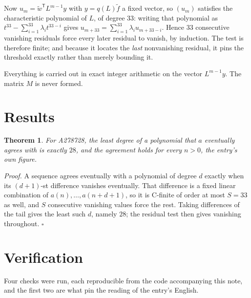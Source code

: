 \documentclass[11pt]{article}
\newtheorem{theorem}{Theorem}
\theoremstyle{definition}
\begin{document}
Now $u_m = \tilde w^{\mathsf T} L^{m-1} y$ with $y = q(L)\tilde f$ a fixed vector, so $(u_m)$ satisfies the characteristic polynomial of $L$, of degree $33$: writing that polynomial as $t^{33} - \sum_{i=1}^{33} \lambda_i t^{33-i}$ gives $u_{m+33} = \sum_{i=1}^{33} \lambda_i u_{m+33-i}$. Hence $33$ consecutive vanishing residuals force every later residual to vanish, by induction. The test is therefore finite; and because it locates the {\itshape last} nonvanishing residual, it pins the threshold exactly rather than merely bounding it.

Everything is carried out in exact integer arithmetic on the vector $L^{m-1}y$. The matrix $M$ is never formed.

\section{Results}

\begin{theorem} For A278728, the least degree of a polynomial that $a$ eventually agrees with is exactly $28$, and the agreement holds for every $n > 0$, the entry's own figure.\end{theorem}

{\itshape Proof.} A sequence agrees eventually with a polynomial of degree $d$ exactly when its $(d+1)$-st difference vanishes eventually. That difference is a fixed linear combination of $a(n),\dots,a(n+d+1)$, so it is C-finite of order at most $S = 33$ as well, and $S$ consecutive vanishing values force the rest. Taking differences of the tail gives the least such $d$, namely $28$; the residual test then gives vanishing throughout. $\square$

\section{Verification}

Four checks were run, each reproducible from the code accompanying this note, and the first two are what pin the reading of the entry's English.
\end{document}
